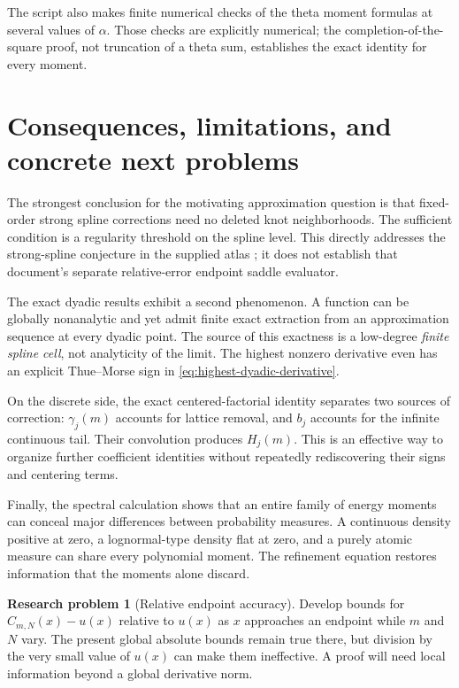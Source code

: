 \documentclass[11pt,a4paper]{article}
\numberwithin{equation}{section}
\theoremstyle{definition}
\newtheorem{problem}[problem]{Research problem}
\begin{document}
The script also makes finite numerical checks of the theta moment
formulas at several values of $\alpha$. Those checks are explicitly
numerical; the completion-of-the-square proof, not truncation of a
theta sum, establishes the exact identity for every moment.

\section{Consequences, limitations, and concrete next problems}\label{sec:frontiers}

The strongest conclusion for the motivating approximation question
is that fixed-order strong spline corrections need no deleted knot
neighborhoods. The sufficient condition is a regularity threshold
on the spline level. This directly addresses the strong-spline
conjecture in the supplied atlas \cite{atlas}; it does not establish
that document's separate relative-error endpoint saddle evaluator.

The exact dyadic results exhibit a second phenomenon. A function
can be globally nonanalytic and yet admit finite exact extraction
from an approximation sequence at every dyadic point. The source
of this exactness is a low-degree \emph{finite spline cell}, not
analyticity of the limit. The highest nonzero derivative even has
an explicit Thue--Morse sign in
\eqref{eq:highest-dyadic-derivative}.

On the discrete side, the exact centered-factorial identity
separates two sources of correction: $\gamma_j(m)$ accounts for
lattice removal, and $b_j$ accounts for the infinite continuous
tail. Their convolution produces $H_j(m)$. This is an effective
way to organize further coefficient identities without repeatedly
rediscovering their signs and centering terms.

Finally, the spectral calculation shows that an entire family of
energy moments can conceal major differences between probability
measures. A continuous density positive at zero, a lognormal-type
density flat at zero, and a purely atomic measure can share every
polynomial moment. The refinement equation restores information
that the moments alone discard.

\begin{problem}[Relative endpoint accuracy]
Develop bounds for $C_{m,N}(x)-u(x)$ relative to $u(x)$ as $x$
approaches an endpoint while $m$ and $N$ vary. The present global
absolute bounds remain true there, but division by the very small
value of $u(x)$ can make them ineffective. A proof will need local
information beyond a global derivative norm.
\end{problem}
\end{document}
